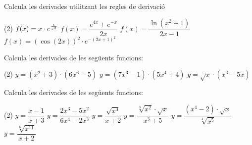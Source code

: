 \begin{mylist}
	
	\exer Calcula les derivades utilitzant les regles de derivació
	
	\begin{tasks}(2)
		\task $f(x)=x\cdot e^{1 \over x^2}$
		\task $f(x)=\dfrac{e^{4x}+e^{-x}}{2x}$
		\task $f(x)=\dfrac{\ln (x^2+1)}{2x-1}$
		\task $f(x)= \left(\cos (2x) \right)^2 \cdot e^{-(2x+1)^2}$
	\end{tasks}

\answers{[$f'=(1-\dfrac{2}{x^2}) e^{1\over x^2}$, $f'=\dfrac{(4x-1)e^{4x}-(x+1)e^{-x}}{2x^2}$, $f'=\dfrac{2x}{(x^2+1)(2x-1)}.\dfrac{2\ln(x^2+1)}{(2x-1)^2}$, 
	$f'=-4 e^{-(2x+1)^2} \cos(2x) \cdot \left[ \sin(2x)+(2x+1) \cos(2x) \right]$ ]}

	
	 
	\exer  Calcula les derivades de les següents funcions:
	
	\begin{tasks}(2)
	\task $y = (x^2 + 3) \cdot (6x^6 - 5)$ 
	\task $y = (7x^3 - 1) \cdot (5x^4 + 4)$ 
	\task $y=\sqrt{x} \cdot (x^{3} -5x)$
	\end{tasks}

\answers{[$y'=48x^7+108 x^5-10x$, $y'=256x^6-20x^3+84x^2$, $y'=\frac{\sqrt{x}}{2} \left(7x^2-15 \right)$]}
 
	\exer  Calcula les derivades de les següents funcions:
	\begin{tasks}(2)
	\task $y=\dfrac{x-1}{x+3} $  
	\task $y=\dfrac{2x^{3} -5x^{2} }{6x^{4} -2x^{3} } $ 
	\task $y=\dfrac{\sqrt{x^{3} } }{x+2} $
	\task $y=\dfrac{\sqrt[{3}]{x^{2} } \cdot \sqrt{x} }{x^{3} +5} $
    \task $y=\dfrac{(x^{4} -2)\cdot \sqrt{x} }{\sqrt[{4}]{x^{5} } } $ 
	\task $y=\dfrac{\sqrt[{6}]{x^{11} } }{x+2} $ 
	\end{tasks}
	
	\answers{[$y'=\dfrac{4}{(x+3)^2}$, $y'=\dfrac{-6x^2+30x-5}{2(3x^2-x)^2}$, 
		$y'=\dfrac{\sqrt{x} (x+6)}{2(x+2)^2}$, $y'=\dfrac{\sqrt[6]{x} (35-11x^3)}{6(x^3+5)^2}$, $y'=4x^3\cdot x^{-3/4}+ (x^4-2)\cdot(-3/4)\cdot x^{-7/4} =\dfrac{13x^4+6}{4\sqrt[4]{x^7}}$, $y'=\dfrac{\sqrt[6]{x^5} (5x+22)}{6(x+2)^2}$]}
	

	
		
	\end{mylist}

